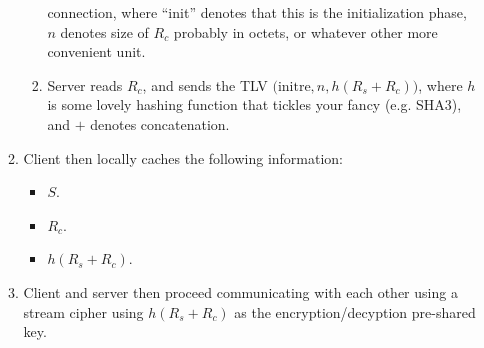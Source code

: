 \documentclass{article}
\begin{document}
\begin{enumerate}
\begin{enumerate}
\begin{enumerate}
                    connection, where ``init'' denotes that this is the
                    initialization phase, $n$ denotes size of $R_c$ probably in
                    octets, or whatever other more convenient unit.
                    \item Server reads $R_c$, and sends the TLV
                    $\big(\text{initre}, n, h(R_s + R_c)\big)$, where $h$ is
                    some lovely hashing function that tickles your fancy (e.g.
                    SHA3), and $+$ denotes concatenation.
                \end{enumerate}
            \item Client then locally caches the following information:
                \begin{itemize}
                    \item $S$.
                    \item $R_c$.
                    \item $h(R_s + R_c)$.
                \end{itemize}
            \item Client and server then proceed communicating with each other
            using a stream cipher using $h(R_s + R_c)$ as the
            encryption/decyption pre-shared key.


\end{enumerate}
\end{enumerate}
\end{document}
